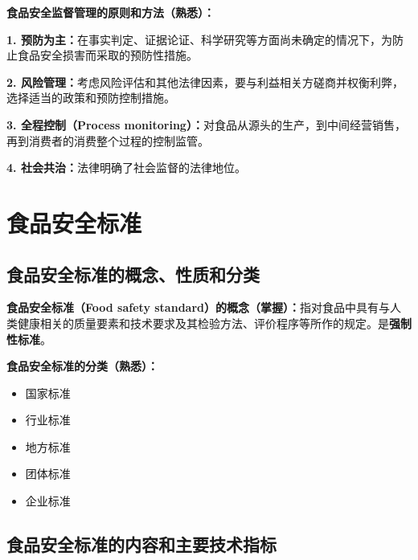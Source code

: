 \begin{defbox}
\textbf{食品安全监督管理的原则和方法（熟悉）：}

\textbf{1. 预防为主：}在事实判定、证据论证、科学研究等方面尚未确定的情况下，为防止食品安全损害而采取的预防性措施。

\textbf{2. 风险管理：}考虑风险评估和其他法律因素，要与利益相关方磋商并权衡利弊，选择适当的政策和预防控制措施。

\textbf{3. 全程控制（Process monitoring）：}对食品从源头的生产，到中间经营销售，再到消费者的消费整个过程的控制监管。

\textbf{4. 社会共治：}法律明确了社会监督的法律地位。
\end{defbox}

\section{食品安全标准}

\subsection{食品安全标准的概念、性质和分类}

\begin{keybox}
\textbf{食品安全标准（Food safety standard）的概念（掌握）：}指对食品中具有与人类健康相关的质量要素和技术要求及其检验方法、评价程序等所作的规定。是\textbf{强制性标准}。
\end{keybox}

\begin{defbox}
\textbf{食品安全标准的分类（熟悉）：}
\begin{itemize}[leftmargin=*]
    \item 国家标准
    \item 行业标准
    \item 地方标准
    \item 团体标准
    \item 企业标准
\end{itemize}
\end{defbox}

\subsection{食品安全标准的内容和主要技术指标}


